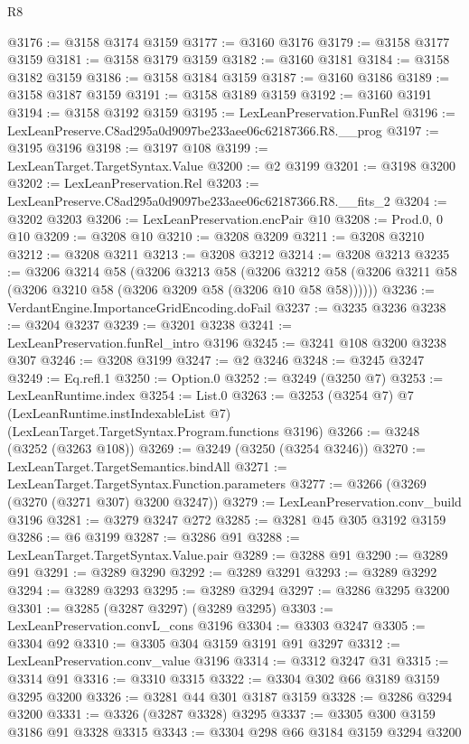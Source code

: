 \begin{lexlean}{R8}
\begin{coremodule}
@3176 := @3158 @3174 @3159
@3177 := @3160 @3176
@3179 := @3158 @3177 @3159
@3181 := @3158 @3179 @3159
@3182 := @3160 @3181
@3184 := @3158 @3182 @3159
@3186 := @3158 @3184 @3159
@3187 := @3160 @3186
@3189 := @3158 @3187 @3159
@3191 := @3158 @3189 @3159
@3192 := @3160 @3191
@3194 := @3158 @3192 @3159
@3195 := LexLeanPreservation.FunRel
@3196 := LexLeanPreserve.C8ad295a0d9097be233aee06c62187366.R8.__prog
@3197 := @3195 @3196
@3198 := @3197 @108
@3199 := LexLeanTarget.TargetSyntax.Value
@3200 := @2 @3199
@3201 := @3198 @3200
@3202 := LexLeanPreservation.Rel
@3203 := LexLeanPreserve.C8ad295a0d9097be233aee06c62187366.R8.__fits_2
@3204 := @3202 @3203
@3206 := LexLeanPreservation.encPair @10
@3208 := Prod.{0, 0} @10
@3209 := @3208 @10
@3210 := @3208 @3209
@3211 := @3208 @3210
@3212 := @3208 @3211
@3213 := @3208 @3212
@3214 := @3208 @3213
@3235 := @3206
    @3214
    @58
    (@3206
      @3213
      @58
      (@3206 @3212 @58 (@3206 @3211 @58 (@3206 @3210 @58 (@3206 @3209 @58 (@3206 @10 @58 @58))))))
@3236 := VerdantEngine.ImportanceGridEncoding.doFail
@3237 := @3235 @3236
@3238 := @3204 @3237
@3239 := @3201 @3238
@3241 := LexLeanPreservation.funRel_intro @3196
@3245 := @3241 @108 @3200 @3238 @307
@3246 := @3208 @3199
@3247 := @2 @3246
@3248 := @3245 @3247
@3249 := Eq.refl.{1}
@3250 := Option.{0}
@3252 := @3249 (@3250 @7)
@3253 := LexLeanRuntime.index
@3254 := List.{0}
@3263 := @3253
    (@3254 @7)
    @7
    (LexLeanRuntime.instIndexableList @7)
    (LexLeanTarget.TargetSyntax.Program.functions @3196)
@3266 := @3248 (@3252 (@3263 @108))
@3269 := @3249 (@3250 (@3254 @3246))
@3270 := LexLeanTarget.TargetSemantics.bindAll
@3271 := LexLeanTarget.TargetSyntax.Function.parameters
@3277 := @3266 (@3269 (@3270 (@3271 @307) @3200 @3247))
@3279 := LexLeanPreservation.conv_build @3196
@3281 := @3279 @3247 @272
@3285 := @3281 @45 @305 @3192 @3159
@3286 := @6 @3199
@3287 := @3286 @91
@3288 := LexLeanTarget.TargetSyntax.Value.pair
@3289 := @3288 @91
@3290 := @3289 @91
@3291 := @3289 @3290
@3292 := @3289 @3291
@3293 := @3289 @3292
@3294 := @3289 @3293
@3295 := @3289 @3294
@3297 := @3286 @3295 @3200
@3301 := @3285 (@3287 @3297) (@3289 @3295)
@3303 := LexLeanPreservation.convL_cons @3196
@3304 := @3303 @3247
@3305 := @3304 @92
@3310 := @3305 @304 @3159 @3191 @91 @3297
@3312 := LexLeanPreservation.conv_value @3196
@3314 := @3312 @3247 @31
@3315 := @3314 @91
@3316 := @3310 @3315
@3322 := @3304 @302 @66 @3189 @3159 @3295 @3200
@3326 := @3281 @44 @301 @3187 @3159
@3328 := @3286 @3294 @3200
@3331 := @3326 (@3287 @3328) @3295
@3337 := @3305 @300 @3159 @3186 @91 @3328 @3315
@3343 := @3304 @298 @66 @3184 @3159 @3294 @3200

\end{coremodule}
\end{lexlean}
